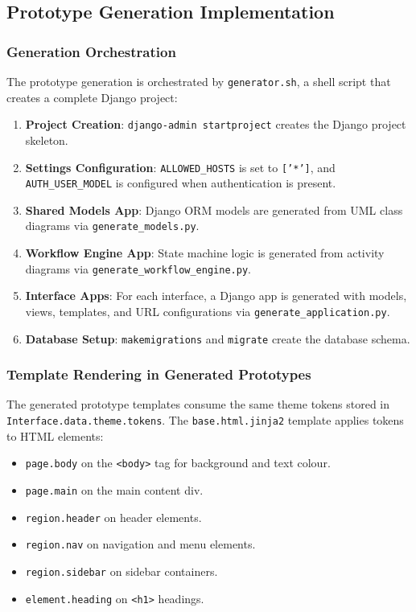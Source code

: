 \subsection{Prototype Generation Implementation}

\subsubsection{Generation Orchestration}

The prototype generation is orchestrated by \texttt{generator.sh}, a shell script that creates a complete Django project:

\begin{enumerate}
    \item \textbf{Project Creation}: \texttt{django-admin startproject} creates the Django project skeleton.
    \item \textbf{Settings Configuration}: \texttt{ALLOWED\_HOSTS} is set to \texttt{['*']}, and \texttt{AUTH\_USER\_MODEL} is configured when authentication is present.
    \item \textbf{Shared Models App}: Django ORM models are generated from UML class diagrams via \texttt{generate\_models.py}.
    \item \textbf{Workflow Engine App}: State machine logic is generated from activity diagrams via \texttt{generate\_workflow\_engine.py}.
    \item \textbf{Interface Apps}: For each interface, a Django app is generated with models, views, templates, and URL configurations via \texttt{generate\_application.py}.
    \item \textbf{Database Setup}: \texttt{makemigrations} and \texttt{migrate} create the database schema.
\end{enumerate}

\subsubsection{Template Rendering in Generated Prototypes}

The generated prototype templates consume the same theme tokens stored in \texttt{Interface.data.theme.tokens}. The \texttt{base.html.jinja2} template applies tokens to HTML elements:

\begin{itemize}
    \item \texttt{page.body} on the \texttt{<body>} tag for background and text colour.
    \item \texttt{page.main} on the main content div.
    \item \texttt{region.header} on header elements.
    \item \texttt{region.nav} on navigation and menu elements.
    \item \texttt{region.sidebar} on sidebar containers.
    \item \texttt{element.heading} on \texttt{<h1>} headings.
\end{itemize}

